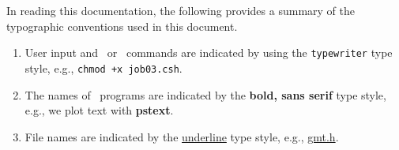 In reading this documentation, the following provides a summary of
the typographic conventions used in this document.

\begin{enumerate}

\item User input and \GMT\ or \UNIX\ commands are indicated by
using the \texttt{typewriter} type style, e.g.,
\texttt{chmod +x job03.csh}.

\item The names of \GMT\ programs are indicated by the
\textsf{\textbf{bold, sans serif}} type style, e.g.,
we plot text with \textsf{\textbf{pstext}}.


\item File names are indicated by the \underline{underline}
type style, e.g., \underline{gmt.h}.

\end{enumerate}
